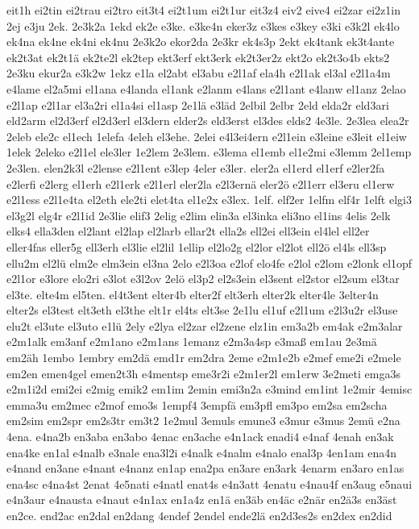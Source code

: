 {eit1h
ei2tin
ei2trau
ei2tro
eit3t4
ei2t1um
ei2t1ur
eit3z4
eiv2
eive4
ei2zar
ei2z1in
2ej
e3ju
2ek.
2e3k2a
1ekd
ek2e
e3ke.
e3ke4n
eker3z
e3kes
e3key
e3ki
e3k2l
ek4lo
ek4na
ek4ne
ek4ni
ek4nu
2e3k2o
ekor2da
2e3kr
ek4s3p
2ekt
ek4tank
ek3t4ante
ek2t3at
ek2t1ä
ek2te2l
ek2tep
ekt3erf
ekt3erk
ek2t3er2z
ekt2o
ek2t3o4b
ekts2
2e3ku
ekur2a
e3k2w
1ekz
e1la
el2abt
el3abu
e2l1af
ela4h
e2l1ak
el3al
e2l1a4m
e4lame
el2a5mi
el1ana
e4landa
el1ank
e2lanm
e4lans
e2l1ant
e4lanw
el1anz
2elao
e2l1ap
e2l1ar
el3a2ri
el1a4si
el1asp
2e1lä
e3läd
2elbil
2elbr
2eld
elda2r
eld3ari
eld2arm
el2d3erf
el2d3erl
el3dern
elder2s
eld3erst
el3des
elds2
4e3le.
2e3lea
elea2r
2eleb
ele2c
el1ech
1elefa
4eleh
el3ehe.
2elei
e4l3ei4ern
e2l1ein
e3leine
e3leit
el1eiw
1elek
2eleko
e2l1el
ele3ler
1e2lem
2e3lem.
e3lema
el1emb
el1e2mi
e3lemm
2el1emp
2e3len.
elen2k3l
e2lense
e2l1ent
e3lep
4eler
e3ler.
eler2a
el1erd
el1erf
e2ler2fa
e2lerfi
e2lerg
el1erh
e2l1erk
e2l1erl
eler2la
e2l3ernä
eler2ö
e2l1err
el3eru
el1erw
e2l1ess
e2l1e4ta
el2eth
ele2ti
elet4ta
el1e2x
e3lex.
1elf.
elf2er
1elfm
elf4r
1elft
elgi3
el3g2l
elg4r
e2l1id
2e3lie
elif3
2elig
e2lim
elin3a
el3inka
eli3no
el1ins
4elis
2elk
elks4
ella3den
el2lant
el2lap
el2larb
ellar2t
ella2s
ell2ei
ell3ein
el4lel
ell2er
eller4fas
eller5g
ell3erh
el3lie
el2lil
1ellip
el2lo2g
el2lor
el2lot
ell2ö
el4ls
ell3sp
ellu2m
el2lü
elm2e
elm3ein
el3na
2elo
e2l3oa
e2lof
elo4fe
e2lol
e2lom
e2lonk
el1opf
e2l1or
e3lore
elo2ri
e3lot
e3l2ov
2elö
el3p2
el2s3ein
el3sent
el2stor
el2sum
el3tar
el3te.
elte4m
el5ten.
el4t3ent
elter4b
elter2f
elt3erh
elter2k
elter4le
3elter4n
elter2s
el3test
elt3eth
el3the
elt1r
el4ts
elt3se
2e1lu
el1uf
e2l1um
e2l3u2r
el3use
elu2t
el3ute
el3uto
e1lü
2ely
e2lya
el2zar
el2zene
elz1in
em3a2b
em4ak
e2m3alar
e2m1alk
em3anf
e2m1ano
e2m1ans
1emanz
e2m3a4sp
e3maß
em1au
2e3mä
em2äh
1embo
1embry
em2dä
emd1r
em2dra
2eme
e2m1e2b
e2mef
eme2i
e2mele
em2en
emen4gel
emen2t3h
e4mentsp
eme3r2i
e2m1er2l
em1erw
3e2meti
emga3s
e2m1i2d
emi2ei
e2mig
emik2
em1im
2emin
emi3n2a
e3mind
em1int
1e2mir
4emisc
emma3u
em2mec
e2mof
emo3s
1empf4
3empfä
em3pfl
em3po
em2sa
em2scha
em2sim
em2spr
em2s3tr
em3t2
1e2mul
3emuls
emune3
e3mur
e3mus
2emü
e2na
4ena.
e4na2b
en3aba
en3abo
4enac
en3ache
e4n1ack
enadi4
e4naf
4enah
en3ak
ena4ke
en1al
e4nalb
e3nale
ena3l2i
e4nalk
e4nalm
e4nalo
enal3p
4en1am
ena4n
e4nand
en3ane
e4nant
e4nanz
en1ap
ena2pa
en3are
en3ark
4enarm
en3aro
en1as
ena4sc
e4na4st
2enat
4e5nati
e4natl
enat4s
e4n3att
4enatu
e4nau4f
en3aug
e5naui
e4n3aur
e4nausta
e4naut
e4n1ax
en1a4z
en1ä
en3äb
en4äc
e2när
en2ä3s
en3äst
en2ce.
end2ac
en2dal
en2dang
4endef
2endel
ende2lä
en2d3es2s
en2dex
en2did
}
